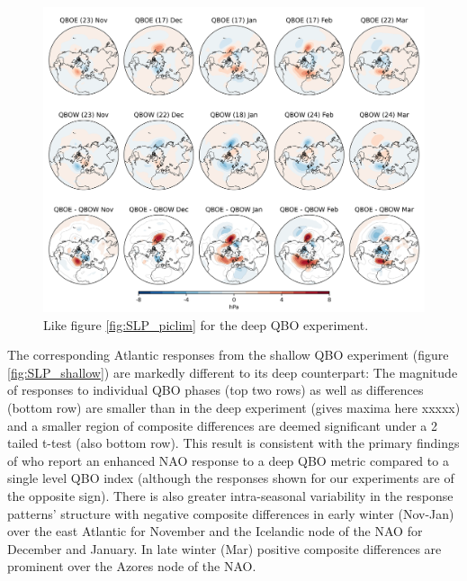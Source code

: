 \begin{figure}[h!]
\begin{center}
\noindent\includegraphics[width =0.8\linewidth]{Figures/Figures-deepQBO/SLP_composites_individual_months_QBO_phases_U_d_higher_50hPa_5thresh.png}
\caption[]{Like figure \ref{fig:SLP_piclim} for the deep QBO experiment.}
\label{fig:SLP_deep}
\end{center}
\end{figure}

The corresponding Atlantic responses from the shallow QBO experiment (figure \ref{fig:SLP_shallow}) are markedly different to its deep counterpart: The magnitude of responses to individual QBO phases (top two rows) as well as differences (bottom row) are smaller than in the deep experiment (gives maxima here xxxxx) and a smaller region of composite differences are deemed significant under a 2 tailed t-test (also bottom row). This result is consistent with the primary findings of \cite{andrewsObserved2019d} who report an enhanced NAO response to a deep QBO metric compared to a single level QBO index (although the responses shown for our experiments are of the opposite sign). There is also greater intra-seasonal variability in the response patterns' structure with negative composite differences in early winter (Nov-Jan) over the east Atlantic for November and the Icelandic node of the NAO for December and January. In late winter (Mar) positive composite differences are prominent over the Azores node of the NAO. 

